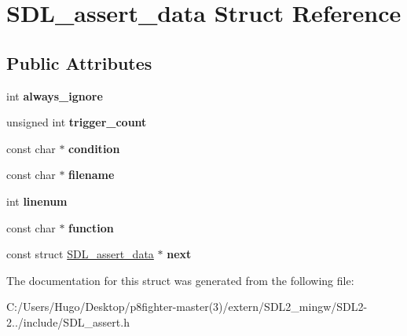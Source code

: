 \hypertarget{struct_s_d_l__assert__data}{}\section{S\+D\+L\+\_\+assert\+\_\+data Struct Reference}
\label{struct_s_d_l__assert__data}
\subsection*{Public Attributes}
\begin{DoxyCompactItemize}
\item 
\mbox{\label{struct_s_d_l__assert__data_ac8997040e60dd538facd3604f0498dd4}} 
int {\bfseries always\+\_\+ignore}
\item 
\mbox{\label{struct_s_d_l__assert__data_ac3e02d5e1ed06d11f7e49b6d652655d6}} 
unsigned int {\bfseries trigger\+\_\+count}
\item 
\mbox{\label{struct_s_d_l__assert__data_aa2e21779fd9c5fd035c6deabe8aa4325}} 
const char $\ast$ {\bfseries condition}
\item 
\mbox{\label{struct_s_d_l__assert__data_ac4ae13a8034710658976e462a508ed39}} 
const char $\ast$ {\bfseries filename}
\item 
\mbox{\label{struct_s_d_l__assert__data_aec495b21ff71db1226eff0e6d5db333a}} 
int {\bfseries linenum}
\item 
\mbox{\label{struct_s_d_l__assert__data_a437899d4b1faaab73d14096374a5a18b}} 
const char $\ast$ {\bfseries function}
\item 
\mbox{\label{struct_s_d_l__assert__data_a8737ef791c8f3f1f4db4c8f627543936}} 
const struct \hyperlink{struct_s_d_l__assert__data}{S\+D\+L\+\_\+assert\+\_\+data} $\ast$ {\bfseries next}
\end{DoxyCompactItemize}


The documentation for this struct was generated from the following file\+:\begin{DoxyCompactItemize}
\item 
C\+:/\+Users/\+Hugo/\+Desktop/p8fighter-\/master(3)/extern/\+S\+D\+L2\+\_\+mingw/\+S\+D\+L2-\/2../include/S\+D\+L\+\_\+assert.\+h\end{DoxyCompactItemize}

